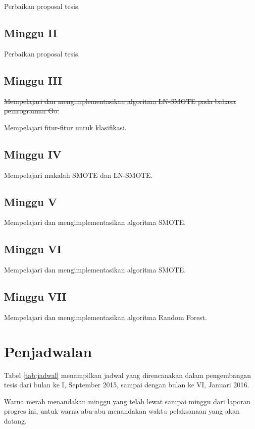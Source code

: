 Perbaikan proposal tesis.

\subsection{Minggu II}

Perbaikan proposal tesis.

\subsection{Minggu III}

\sout{
Mempelajari dan mengimplementasikan algoritma LN-SMOTE pada bahasa pemrograman Go.
}

Mempelajari fitur-fitur untuk klasifikasi.

\subsection{Minggu IV}

Mempelajari makalah SMOTE dan LN-SMOTE.

\subsection{Minggu V}
Mempelajari dan mengimplementasikan algoritma SMOTE.

\subsection{Minggu VI}
Mempelajari dan mengimplementasikan algoritma SMOTE.

\subsection{Minggu VII}
Mempelajari dan mengimplementasikan algoritma Random Forest.


\newpage
\section{Penjadwalan}\label{sec:penjadwalan}

Tabel \ref{tab:jadwal} menampilkan jadwal yang direncanakan dalam pengembangan tesis dari bulan ke I, September 2015, sampai dengan bulan ke VI, Januari 2016.

Warna merah menandakan minggu yang telah lewat sampai minggu dari laporan progres ini, untuk warna abu-abu menandakan waktu pelaksanaan yang akan datang.

